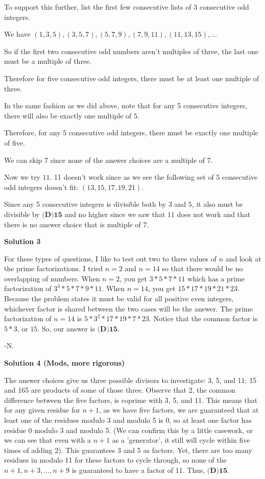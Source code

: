 \begin{enumerate}
 To support this further, list the first few  consecutive lists of 3 consecutive odd integers.

 We have $(1, 3, 5), (3, 5, 7), (5, 7, 9), (7, 9, 11), (11, 13, 15), \ldots$

 So if the first two consecutive odd numbers aren't multiples of three, the last one must be a multiple of three.

 Therefore for five consecutive odd integers, there must be at least one multiple of three.

 In the same fashion as we did above, note that for any 5 consecutive integers, there will also be exactly one multiple of $5.$

 Therefore, for any 5 consecutive odd integers, there must be exactly one multiple of five.

 We can skip 7 since none of the answer choices are a multiple of 7.

 Now we try $11.$ 11 doesn't work since as we see the following set of 5 consecutive odd integers doesn't fit: $(13, 15, 17, 19, 21).$

 Since any 5 consecutive integers is divisible both by $3$ and $5$, it also must be divisible by ${\boxed{\textbf{(D)15}}}$ and no higher since we saw that $11$ does not work and that there is no answer choice that is multiple of $7$.

 


 



\textbf{Solution 3}

For these types of questions, I like to test out two to three values of $n$ and look at the prime factorizations. I tried $n = 2$ and $n = 14$ so that there would be no overlapping of numbers. When $n = 2$, you get $3 * 5 * 7 * 11$ which has a prime factorization of $3^3 * 5 * 7 * 9 * 11$. When $n = 14$, you get $15 * 17 * 19 * 21 * 23$. Because the problem states it must be valid for all positive even integers, whichever factor is shared between the two cases will be the answer. The prime factorization of $n = 14$ is $5 * 3^2 * 17 * 19 * 7 * 23$. Notice that the common factor is $5*3$, or $15$. So, our answer is ${\boxed{\textbf{(D)15}}}$.

 -N.

 



\textbf{Solution 4 (Mods, more rigorous)}

The answer choices give us three possible divisors to investigate: 3, 5, and 11; 15 and 165 are products of some of those three. Observe that 2, the common difference between the five factors, is coprime with 3, 5, and 11. This means that for any given residue for $n+1$, as we have five factors, we are guaranteed that at least one of the residues modulo 3 and modulo 5 is 0, so at least one factor has residue 0 modulo 3 and modulo 5. (We can confirm this by a little casework, or we can see that even with a $n+1$ as a 'generator', it still will cycle within five times of adding 2). This guarantees 3 and 5 as factors. Yet, there are too many residues in modulo 11 for these factors to cycle through, so none of the $n+1,n+3,\dots,n+9$ is guaranteed to have a factor of 11. Thus, ${\boxed{\textbf{(D)15}}}$.


\end{enumerate}
